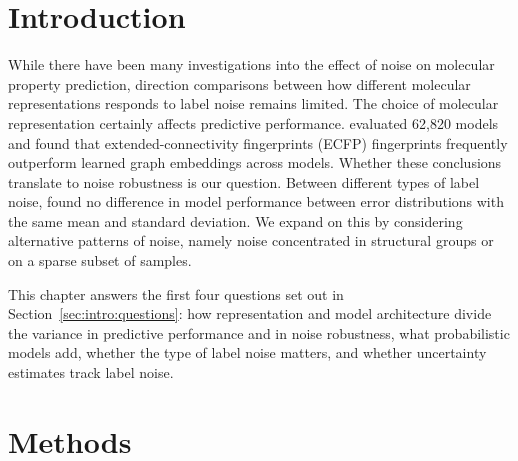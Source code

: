 \section{Introduction}


While there have been many investigations into the effect of noise on molecular property prediction, direction comparisons between how different molecular representations responds to label noise remains limited. The choice of molecular representation certainly affects predictive performance. \cite{Deng2023} evaluated 62,820 models and found that extended-connectivity fingerprints (ECFP) fingerprints frequently outperform learned graph embeddings across models. Whether these conclusions translate to noise robustness is our question. Between different types of label noise, \cite{Heid2023} found no difference in model performance between error distributions with the same mean and standard deviation. We expand on this by considering alternative patterns of noise, namely noise concentrated in structural groups or on a sparse subset of samples.

This chapter answers the first four questions set out in Section~\ref{sec:intro:questions}: how representation and model architecture divide the variance in predictive performance and in noise robustness, what probabilistic models add, whether the type of label noise matters, and whether uncertainty estimates track label noise.

\section{Methods}\label{sec:robustness:methods}


